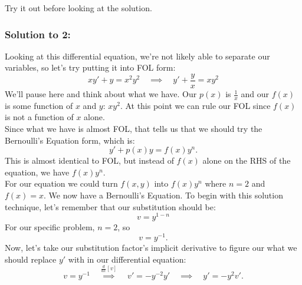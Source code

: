 \documentclass[a4paper,12pt]{article} %
\begin{document}
Try it out before looking at the solution.
\pagebreak

\subsubsection*{Solution to 2:}
Looking at this differential equation, we're not likely able to separate our variables, so let's try putting it into FOL form:
$$ xy' + y = x^2y^2 \quad\implies \quad y' + \frac{y}{x} = xy^2$$
We'll pause here and think about what we have. Our $p(x)$ is $\frac{1}{x}$ and our $f(x)$ is some function of $x$ and $y$: $xy^2$. At this point we can rule our FOL since $f(x)$ is not a function of $x$ alone.\\

Since what we have is almost FOL, that tells us that we should try the Bernoulli's Equation form, which is:
$$ y' + p(x)y = f(x)y^n. $$
This is almost identical to FOL, but instead of $f(x)$ alone on the RHS of the equation, we have $f(x)y^n$.\\

For our equation we could turn $f(x,y)$ into $f(x)y^n$ where $n=2$ and $f(x)=x$. We now have
a Bernoulli's Equation. To begin with this solution technique, let's remember that our substitution should be:
$$ \boxed{v = y^{1-n}} $$
For our specific problem, $n=2$, so
$$ v = y^{-1}.$$
Now, let's take our substitution factor's implicit derivative to figure our what we should replace $y'$ with in our differential equation:
$$ v = y^{-1} \quad\overset{\frac{d}{dx}[v]}\implies \quad v' = -y^{-2}y' \quad\implies \quad y' = -y^2v'.$$
\end{document}
